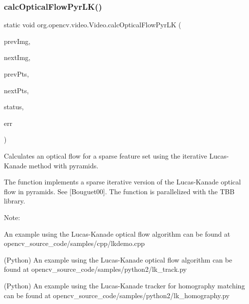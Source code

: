 \subsubsection{\texorpdfstring{calc\+Optical\+Flow\+Pyr\+L\+K()}{calcOpticalFlowPyrLK()}\hspace{0.1cm}{\footnotesize\ttfamily [3/3]}}
{\footnotesize\ttfamily static void org.\+opencv.\+video.\+Video.\+calc\+Optical\+Flow\+Pyr\+LK (\begin{DoxyParamCaption}\item[{\mbox{\hyperlink{classorg_1_1opencv_1_1core_1_1_mat}{Mat}}}]{prev\+Img,  }\item[{\mbox{\hyperlink{classorg_1_1opencv_1_1core_1_1_mat}{Mat}}}]{next\+Img,  }\item[{\mbox{\hyperlink{classorg_1_1opencv_1_1core_1_1_mat_of_point2f}{Mat\+Of\+Point2f}}}]{prev\+Pts,  }\item[{\mbox{\hyperlink{classorg_1_1opencv_1_1core_1_1_mat_of_point2f}{Mat\+Of\+Point2f}}}]{next\+Pts,  }\item[{\mbox{\hyperlink{classorg_1_1opencv_1_1core_1_1_mat_of_byte}{Mat\+Of\+Byte}}}]{status,  }\item[{\mbox{\hyperlink{classorg_1_1opencv_1_1core_1_1_mat_of_float}{Mat\+Of\+Float}}}]{err }\end{DoxyParamCaption})\hspace{0.3cm}{\ttfamily [static]}}

Calculates an optical flow for a sparse feature set using the iterative Lucas-\/\+Kanade method with pyramids.

The function implements a sparse iterative version of the Lucas-\/\+Kanade optical flow in pyramids. See \mbox{[}Bouguet00\mbox{]}. The function is parallelized with the T\+BB library.

Note\+:


\begin{DoxyItemize}
\item An example using the Lucas-\/\+Kanade optical flow algorithm can be found at opencv\+\_\+source\+\_\+code/samples/cpp/lkdemo.\+cpp 
\item (Python) An example using the Lucas-\/\+Kanade optical flow algorithm can be found at opencv\+\_\+source\+\_\+code/samples/python2/lk\+\_\+track.\+py 
\item (Python) An example using the Lucas-\/\+Kanade tracker for homography matching can be found at opencv\+\_\+source\+\_\+code/samples/python2/lk\+\_\+homography.\+py 
\end{DoxyItemize}


